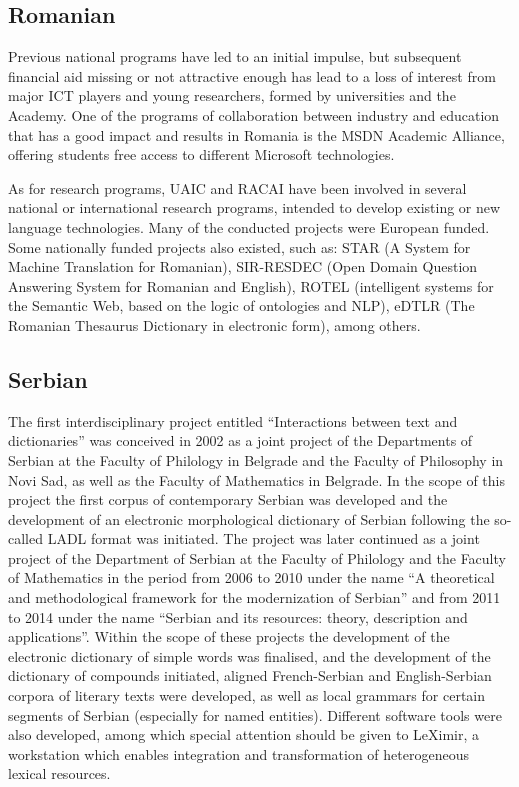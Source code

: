 \documentclass[10pt, plain]{../../metanetpaper}
\begin{document}
\begin{multicols}{2}
\begin{small}
\subsection*{Romanian}
\label{sec:romanian}

Previous national programs have led to an initial impulse, but subsequent financial aid missing or not attractive enough has lead to a loss of interest from major ICT players and young researchers, formed by universities and the Academy. One of the programs of collaboration between industry and education that has a good impact and results in Romania is the MSDN Academic Alliance, offering students free access to different Microsoft technologies.

As for research programs, UAIC and RACAI have been involved in several national or international research programs, intended to develop existing or new language technologies. Many of the conducted projects were European funded. Some nationally funded projects also existed, such as: STAR (A System for Machine Translation for Romanian), SIR-RESDEC (Open Domain Question Answering System for Romanian and English), ROTEL (intelligent systems for the Semantic Web, based on the logic of ontologies and NLP), eDTLR (The Romanian Thesaurus Dictionary in electronic form), among others.

\subsection*{Serbian}
\label{sec:serbian}

The first interdisciplinary project entitled “Interactions between text and dictionaries” was conceived in 2002 as a joint project of the Departments of Serbian at the Faculty of Philology in Belgrade and the Faculty of Philosophy in Novi Sad, as well as the Faculty of Mathematics in Belgrade. In the scope of this project the first corpus of contemporary Serbian was developed and the development of an electronic morphological dictionary of Serbian following the so-called LADL format was initiated.  The project was later continued as a joint project of the Department of Serbian at the Faculty of Philology and the Faculty of Mathematics in the period from 2006 to 2010 under the name “A theoretical and methodological framework for the modernization of Serbian” and from 2011 to 2014 under the name “Serbian and its resources: theory, description and applications”. Within the scope of these projects the development of the electronic dictionary of simple words was finalised, and the development of the dictionary of compounds initiated, aligned French-Serbian and English-Serbian corpora of literary texts were developed, as well as local grammars for certain segments of Serbian (especially for named entities). Different software tools were also developed, among which special attention should be given to LeXimir, a workstation which enables integration and transformation of heterogeneous lexical resources.


\end{small}
\end{multicols}
\end{document}
